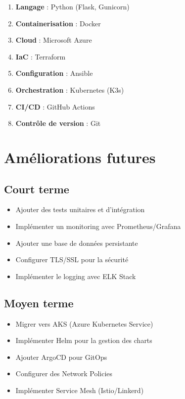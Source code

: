 \documentclass[12pt,a4paper,twoside]{report}
\begin{document}
\begin{enumerate}
    \item \textbf{Langage} : Python (Flask, Gunicorn)
    \item \textbf{Containerisation} : Docker
    \item \textbf{Cloud} : Microsoft Azure
    \item \textbf{IaC} : Terraform
    \item \textbf{Configuration} : Ansible
    \item \textbf{Orchestration} : Kubernetes (K3s)
    \item \textbf{CI/CD} : GitHub Actions
    \item \textbf{Contrôle de version} : Git
\end{enumerate}

\section{Améliorations futures}

\subsection{Court terme}

\begin{itemize}
    \item Ajouter des tests unitaires et d'intégration
    \item Implémenter un monitoring avec Prometheus/Grafana
    \item Ajouter une base de données persistante
    \item Configurer TLS/SSL pour la sécurité
    \item Implémenter le logging avec ELK Stack
\end{itemize}

\subsection{Moyen terme}

\begin{itemize}
    \item Migrer vers AKS (Azure Kubernetes Service)
    \item Implémenter Helm pour la gestion des charts
    \item Ajouter ArgoCD pour GitOps
    \item Configurer des Network Policies
    \item Implémenter Service Mesh (Istio/Linkerd)
\end{itemize}
\end{document}
